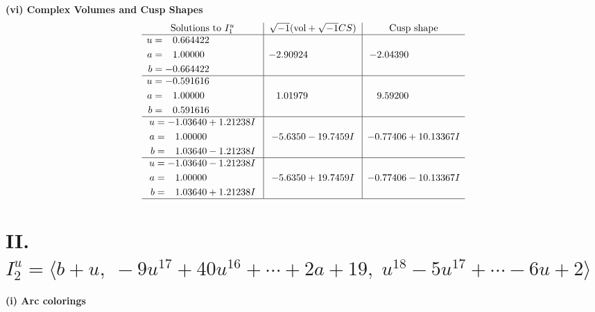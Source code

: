 \documentclass[1p]{elsarticle_modified}
\theoremstyle{definition}
\newcommand{\I}{\sqrt{-1}}
\begin{document}
\newpage\flushleft \textbf{(vi) Complex Volumes and Cusp Shapes}
$$\begin{array}{c|c|c}  
\text{Solutions to }I^u_{1}& \I (\text{vol} + \sqrt{-1}CS) & \text{Cusp shape}\\
 \hline 
\begin{aligned}
u &= \phantom{-}0.664422\phantom{ +0.000000I} \\
a &= \phantom{-}1.00000\phantom{ +0.000000I} \\
b &= -0.664422\phantom{ +0.000000I}\end{aligned}
 & -2.90924\phantom{ +0.000000I} & -2.04390\phantom{ +0.000000I} \\ \hline\begin{aligned}
u &= -0.591616\phantom{ +0.000000I} \\
a &= \phantom{-}1.00000\phantom{ +0.000000I} \\
b &= \phantom{-}0.591616\phantom{ +0.000000I}\end{aligned}
 & \phantom{-}1.01979\phantom{ +0.000000I} & \phantom{-}9.59200\phantom{ +0.000000I} \\ \hline\begin{aligned}
u &= -1.03640 + 1.21238 I \\
a &= \phantom{-}1.00000\phantom{ +0.000000I} \\
b &= \phantom{-}1.03640 - 1.21238 I\end{aligned}
 & -5.6350 - 19.7459 I & -0.77406 + 10.13367 I \\ \hline\begin{aligned}
u &= -1.03640 - 1.21238 I \\
a &= \phantom{-}1.00000\phantom{ +0.000000I} \\
b &= \phantom{-}1.03640 + 1.21238 I\end{aligned}
 & -5.6350 + 19.7459 I & -0.77406 - 10.13367 I\\
 \hline 
 \end{array}$$\newpage\newpage\renewcommand{\arraystretch}{1}
\centering \section*{II. $I^u_{2}= \langle b+u,\;-9 u^{17}+40 u^{16}+\cdots+2 a+19,\;u^{18}-5 u^{17}+\cdots-6 u+2 \rangle$}
\flushleft \textbf{(i) Arc colorings}\\
\end{document}
